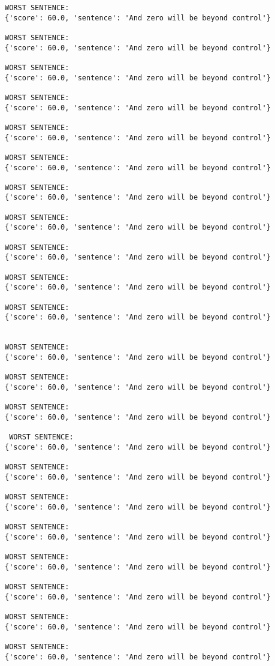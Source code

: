 \documentclass[12pt,a4paper,oneside]{book}
\begin{document}
\begin{verbatim}
WORST SENTENCE:
{'score': 60.0, 'sentence': 'And zero will be beyond control'}

WORST SENTENCE:
{'score': 60.0, 'sentence': 'And zero will be beyond control'}

WORST SENTENCE:
{'score': 60.0, 'sentence': 'And zero will be beyond control'}

WORST SENTENCE:
{'score': 60.0, 'sentence': 'And zero will be beyond control'}

WORST SENTENCE:
{'score': 60.0, 'sentence': 'And zero will be beyond control'}

WORST SENTENCE:
{'score': 60.0, 'sentence': 'And zero will be beyond control'}

WORST SENTENCE:
{'score': 60.0, 'sentence': 'And zero will be beyond control'}

WORST SENTENCE:
{'score': 60.0, 'sentence': 'And zero will be beyond control'}

WORST SENTENCE:
{'score': 60.0, 'sentence': 'And zero will be beyond control'}

WORST SENTENCE:
{'score': 60.0, 'sentence': 'And zero will be beyond control'}

WORST SENTENCE:
{'score': 60.0, 'sentence': 'And zero will be beyond control'}
 
 
WORST SENTENCE:
{'score': 60.0, 'sentence': 'And zero will be beyond control'}

WORST SENTENCE:
{'score': 60.0, 'sentence': 'And zero will be beyond control'}

WORST SENTENCE:
{'score': 60.0, 'sentence': 'And zero will be beyond control'}

 WORST SENTENCE:
{'score': 60.0, 'sentence': 'And zero will be beyond control'}

WORST SENTENCE:
{'score': 60.0, 'sentence': 'And zero will be beyond control'}

WORST SENTENCE:
{'score': 60.0, 'sentence': 'And zero will be beyond control'}

WORST SENTENCE:
{'score': 60.0, 'sentence': 'And zero will be beyond control'}

WORST SENTENCE:
{'score': 60.0, 'sentence': 'And zero will be beyond control'}

WORST SENTENCE:
{'score': 60.0, 'sentence': 'And zero will be beyond control'}

WORST SENTENCE:
{'score': 60.0, 'sentence': 'And zero will be beyond control'}

WORST SENTENCE:
{'score': 60.0, 'sentence': 'And zero will be beyond control'}


\end{verbatim}
\end{document}
